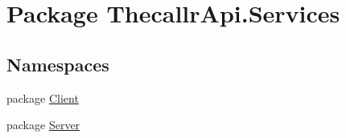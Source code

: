 \hypertarget{namespace_thecallr_api_1_1_services}{\section{Package Thecallr\+Api.\+Services}
\label{namespace_thecallr_api_1_1_services}
}
\subsection*{Namespaces}
\begin{DoxyCompactItemize}
\item 
package \hyperlink{namespace_thecallr_api_1_1_services_1_1_client}{Client}
\item 
package \hyperlink{namespace_thecallr_api_1_1_services_1_1_server}{Server}
\end{DoxyCompactItemize}
